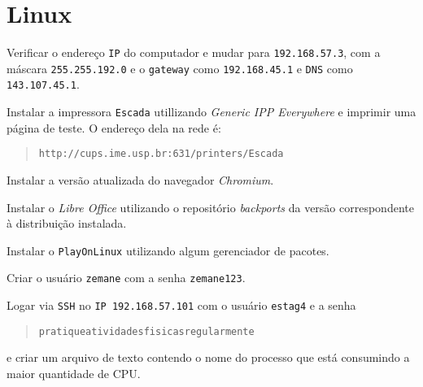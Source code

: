 \section*{Linux}
\begin{questions}

\question
Verificar o endereço \verb+IP+ do computador e mudar para \verb+192.168.57.3+,
com a máscara \verb+255.255.192.0+ e o \verb+gateway+ como \verb+192.168.45.1+
 e \verb+DNS+ como \verb+143.107.45.1+.

\question
Instalar a impressora \verb+Escada+ utillizando \textit{Generic IPP Everywhere} e imprimir uma página de teste. O endereço dela na rede é:

\begin{quote}
\verb+http://cups.ime.usp.br:631/printers/Escada+
\end{quote}

\question
Instalar a versão atualizada do navegador \textit{Chromium}.

\question
Instalar o \textit{Libre Office} utilizando o repositório \textit{backports} da versão correspondente à distribuição instalada.

\question
Instalar o \verb+PlayOnLinux+ utilizando algum gerenciador de pacotes.

\question
Criar o usuário \verb+zemane+ com a senha \verb+zemane123+.

\question
Logar via \verb+SSH+ no \verb+IP 192.168.57.101+ com o usuário \verb+estag4+
e a senha
\begin{quotation}
    \verb+pratiqueatividadesfisicasregularmente+
\end{quotation}
e criar um arquivo de texto contendo o nome do processo que está consumindo a maior quantidade de CPU.


\end{questions}
